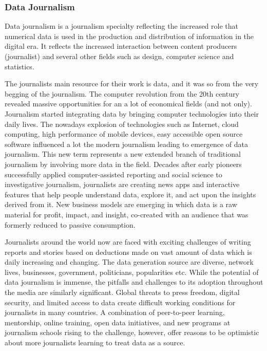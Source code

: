 \subsubsection{Data Journalism}
Data journalism is a journalism specialty reflecting the increased role that numerical data is used in the production and distribution of information in the digital era. It reflects the increased interaction between content producers (journalist) and several other fields such as design, computer science and statistics.

The journalists main resource for their work is data, and it was so from the very begging of the journalism. The computer revolution from the 20th century revealed massive opportunities for an a lot of economical fields (and not only). Journalism started integrating data by bringing computer technologies into their daily lives. The nowadays explosion of technologies such as Internet, cloud computing, high performance of mobile devices, easy accessible open source software influenced a lot the modern journalism leading to emergence of data journalism. This new term represents a new extended branch of traditional journalism by involving more data in the field. Decades after early pioneers successfully applied computer-assisted reporting and social science to investigative journalism, journalists are creating news apps and interactive features that help people understand data, explore it, and act upon the insights derived from it. New business models are emerging in which data is a raw material for profit, impact, and insight, co-created with an audience that was formerly reduced to passive consumption.

Journalists around the world now are faced with exciting challenges of writing reports and stories based on deductions made on vast amount of data which is daily increasing and changing. The data generation source are diverse, network lives, businesses, government, politicians, popularities etc. While the potential of data journalism is immense, the pitfalls and challenges to its adoption throughout the media are similarly significant. Global threats to press freedom, digital security, and limited access to data create difficult working conditions for journalists in many countries. A combination of peer-to-peer learning, mentorship, online training, open data initiatives, and new programs at journalism schools rising to the challenge, however, offer reasons to be optimistic about more journalists learning to treat data as a source.

